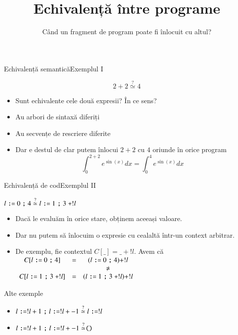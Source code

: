 \documentclass[xcolor=pdftex,romanian,colorlinks]{beamer}
\title[PD---echivalență]{Echivalență între programe}
\subtitle{Când un fragment de program poate fi înlocuit cu altul?}
\begin{document}
\maketitle

\begin{frame}{Echivalență semantică}{Exemplul I}

{\LARGE \[2 + 2 \stackrel{?}{\simeq} 4\] }


\begin{itemize}
\item Sunt echivalente cele două expresii? În ce sens?
\item Au arbori de sintaxă diferiți
\item Au secvențe de rescriere diferite
\item Dar e destul de clar putem înlocui $2+2$ cu $4$ oriunde în orice program
\[\int_0^{2+2}{e^{\sin(x)}}dx = \int_0^4{e^{\sin(x)}}dx\]
\end{itemize}

\end{frame}


\begin{frame}{Echivalență de cod}{Exemplul II}

\begin{block}{\large $l \mathrel{\text{\ttfamily :=}} 0 \mathrel{\text{\ttfamily ;}} 4 \stackrel{?}{\simeq} l \mathrel{\text{\ttfamily :=}} 1 \mathrel{\text{\ttfamily ;}} 3 \mathrel{\text{\ttfamily +}} !l$ }

\begin{itemize}
\item<2-> Dacă le evaluăm în orice stare, obținem aceeași valoare.
\item<3-> Dar \alert{nu} putem să înlocuim o expresie cu cealaltă într-un context arbitrar.
\item<4> De exemplu, fie contextul $C[\_] = \_ + !l$. Avem că
$\begin{array}{ccc}
C[l \mathrel{\text{\ttfamily :=}} 0 \mathrel{\text{\ttfamily ;}} 4] & = &(l \mathrel{\text{\ttfamily :=}} 0 \mathrel{\text{\ttfamily ;}} 4) + !l \\
&&\displaystyle \not\simeq\\ 
C[l \mathrel{\text{\ttfamily :=}} 1 \mathrel{\text{\ttfamily ;}} 3 \mathrel{\text{\ttfamily +}} !l] & = & (l \mathrel{\text{\ttfamily :=}} 1 \mathrel{\text{\ttfamily ;}} 3 \mathrel{\text{\ttfamily +}} !l) + !l
\end{array}$
\end{itemize}
\end{block}
\begin{block}{Alte exemple}
\begin{itemize}
\item $l \mathrel{\text{\ttfamily :=}} !l + 1 \mathrel{\text{\ttfamily ;}} l \mathrel{\text{\ttfamily :=}} !l + -1 \stackrel{?}{\simeq} l \mathrel{\text{\ttfamily :=}} !l$
\item $ l \mathrel{\text{\ttfamily :=}} !l + 1 \mathrel{\text{\ttfamily ;}} l \mathrel{\text{\ttfamily :=}} !l + -1 \stackrel{?}{\simeq} \mathrel{\text{\ttfamily ()}}$
\end{itemize}
\end{block}
\end{frame}
\end{document}
